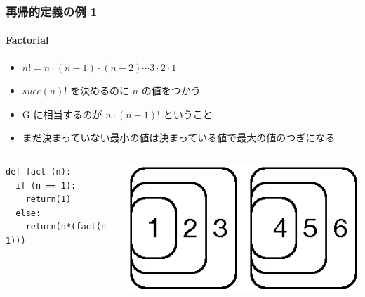 \begin{frame}
\frametitle{再帰的定義の例 1}
\framesubtitle{Factorial}
  \begin{itemize}
\item \(n!=n\cdot(n-1)\cdot(n-2)\cdots 3\cdot 2\cdot 1\)
\item \(\mathit{succ}(n)!\) を決めるのに \(n\) の値をつかう
\item G に相当するのが \(n\cdot(n-1)!\) ということ
\item まだ決まっていない最小の値は決まっている値で最大の値のつぎになる
  \end{itemize}
  \begin{columns}[c]
    \begin{column}{0.5\textwidth}
      \begin{lstlisting}[caption={階乗},label=fact-rec]
def fact (n):
  if (n == 1):
    return(1)
  else:
    return(n*(fact(n-1)))
      \end{lstlisting}
    \end{column}
    \begin{column}{0.45\textwidth}
      \begin{example}[\(4!\)]
\includegraphics[scale=0.5]{./Figure/elementaryCS-2nd-figFact.eps}
      \end{example}
    \end{column}
  \end{columns}
\end{frame}
